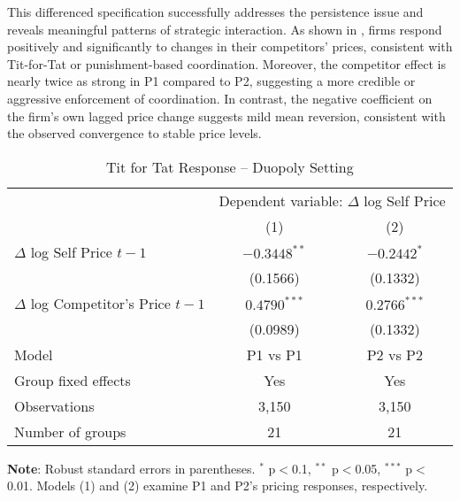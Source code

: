 This differenced specification successfully addresses the persistence issue and reveals meaningful patterns of strategic interaction. As shown in , firms respond positively and significantly to changes in their competitors’ prices, consistent with Tit-for-Tat or punishment-based coordination. Moreover, the competitor effect is nearly twice as strong in P1 compared to P2, suggesting a more credible or aggressive enforcement of coordination. In contrast, the negative coefficient on the firm’s own lagged price change suggests mild mean reversion, consistent with the observed convergence to stable price levels. 

\begin{table}[htpb!]
    \centering
    \caption{Tit for Tat Response – Duopoly Setting}
    \label{tab:fe_duopoly}
    {\small
    \begin{tabular}{lcc}
    \toprule
    & \multicolumn{2}{c}{Dependent variable: $\Delta$ log Self Price} \\
    \cmidrule(lr){2-3}
    & (1) & (2) \\
    \midrule
    $\Delta$ log Self Price $t-1$         & $-0.3448^{**}$ & $-0.2442^{*}$  \\
                             & (0.1566)       & (0.1332)       \\
    $\Delta$ log Competitor's Price $t-1$ & $0.4790^{***}$ & $0.2766^{***}$ \\
                             & (0.0989)       & (0.1332)       \\
    \midrule
    Model                    & P1 vs P1       & P2 vs P2       \\          
    Group fixed effects      & Yes            & Yes            \\
    \midrule
    Observations             & 3,150          & 3,150          \\
    Number of groups         & 21             & 21             \\
    \bottomrule
    \end{tabular}
    }
    \vspace{1mm}
    
    \begin{minipage}{\textwidth}
    \footnotesize{\parbox{1\textwidth}{\textbf{Note}: Robust standard errors in parentheses. $^{*}$ p$<$0.1, $^{**}$ p$<$0.05, $^{***}$ p$<$0.01. Models (1) and (2) examine P1 and P2's pricing responses, respectively. }}
    \end{minipage}
\end{table}

